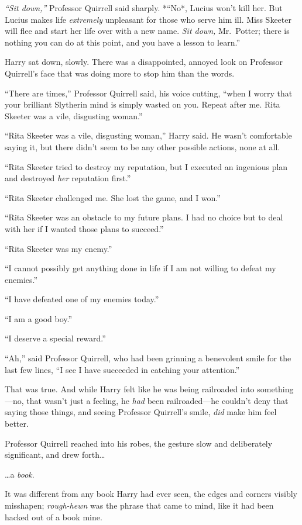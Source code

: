 \emph{``Sit down,''} Professor Quirrell said sharply. *``No*, Lucius
won't kill her. But Lucius makes life \emph{extremely} unpleasant for
those who serve him ill. Miss Skeeter will flee and start her life over
with a new name. \emph{Sit down,} Mr.~Potter; there is nothing you can
do at this point, and you have a lesson to learn.''

Harry sat down, slowly. There was a disappointed, annoyed look on
Professor Quirrell's face that was doing more to stop him than the
words.

``There are times,'' Professor Quirrell said, his voice cutting, ``when
I worry that your brilliant Slytherin mind is simply wasted on you.
Repeat after me. Rita Skeeter was a vile, disgusting woman.''

``Rita Skeeter was a vile, disgusting woman,'' Harry said. He wasn't
comfortable saying it, but there didn't seem to be any other possible
actions, none at all.

``Rita Skeeter tried to destroy my reputation, but I executed an
ingenious plan and destroyed \emph{her} reputation first.''

``Rita Skeeter challenged me. She lost the game, and I won.''

``Rita Skeeter was an obstacle to my future plans. I had no choice but
to deal with her if I wanted those plans to succeed.''

``Rita Skeeter was my enemy.''

``I cannot possibly get anything done in life if I am not willing to
defeat my enemies.''

``I have defeated one of my enemies today.''

``I am a good boy.''

``I deserve a special reward.''

``Ah,'' said Professor Quirrell, who had been grinning a benevolent
smile for the last few lines, ``I see I have succeeded in catching your
attention.''

That was true. And while Harry felt like he was being railroaded into
something---no, that wasn't just a feeling, he \emph{had} been
railroaded---he couldn't deny that saying those things, and seeing
Professor Quirrell's smile, \emph{did} make him feel better.

Professor Quirrell reached into his robes, the gesture slow and
deliberately significant, and drew forth\ldots{}

\ldots{}a \emph{book}.

It was different from any book Harry had ever seen, the edges and
corners visibly misshapen; \emph{rough-hewn} was the phrase that came to
mind, like it had been hacked out of a book mine.

